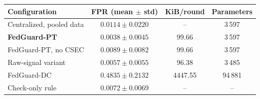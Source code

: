 \begin{tabular}{lccc}
\hline
Configuration & FPR (mean $\pm$ std) & KiB/round & Parameters\\
\hline
Centralized, pooled data
& $0.0114\pm0.0220$ & -- & 3\,597\\
\textbf{FedGuard-PT}
& $\mathbf{0.0038\pm0.0045}$ & 99.66 & 3\,597\\
FedGuard-PT, no CSEC
& $0.0089\pm0.0082$ & 99.66 & 3\,597\\
Raw-signal variant
& $0.0057\pm0.0055$ & 96.38 & 3\,485\\
FedGuard-DC~\cite{Saroare2026FedGuardDC}
& $0.4835\pm0.2132$ & 4447.55 & 94\,881\\
Check-only rule
& $0.0072\pm0.0069$ & -- & --\\
\hline
\end{tabular}
